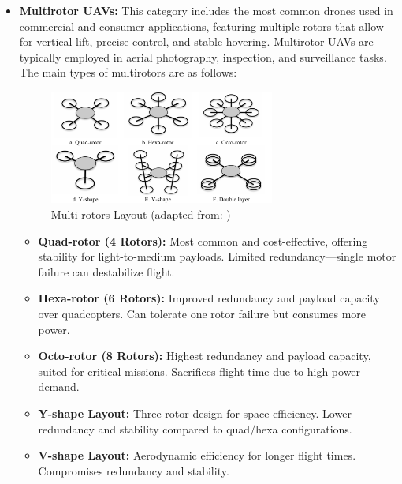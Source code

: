 \begin{itemize}
    \item \textbf{Multirotor UAVs:} This category includes the most common drones used in commercial and consumer applications, featuring multiple rotors that allow for vertical lift, precise control, and stable hovering. Multirotor UAVs are typically employed in aerial photography, inspection, and surveillance tasks. The main types of multirotors are as follows:

    \begin{figure}[H]  %
        \centering
        \includegraphics[width=0.7\textwidth]{Figures/Chapter1/Section1/2.png} %
        \caption{  Multi-rotors Layout  (adapted from: \cite{chen2016state})}
        \label{fig:method3_architecture} %
    \end{figure}
    
\begin{itemize}
    \item \textbf{Quad-rotor (4 Rotors):} Most common and cost-effective, offering stability for light-to-medium payloads. Limited redundancy—single motor failure can destabilize flight. \cite{idk}
    
    \item \textbf{Hexa-rotor (6 Rotors):} Improved redundancy and payload capacity over quadcopters. Can tolerate one rotor failure but consumes more power. \cite{idk}
    
    \item \textbf{Octo-rotor (8 Rotors):} Highest redundancy and payload capacity, suited for critical missions. Sacrifices flight time due to high power demand. \cite{idk}
    
    \item \textbf{Y-shape Layout:} Three-rotor design for space efficiency. Lower redundancy and stability compared to quad/hexa configurations. \cite{idk}
    
    \item \textbf{V-shape Layout:} Aerodynamic efficiency for longer flight times. Compromises redundancy and stability. \cite{idk}
    

\end{itemize}
\end{itemize}
